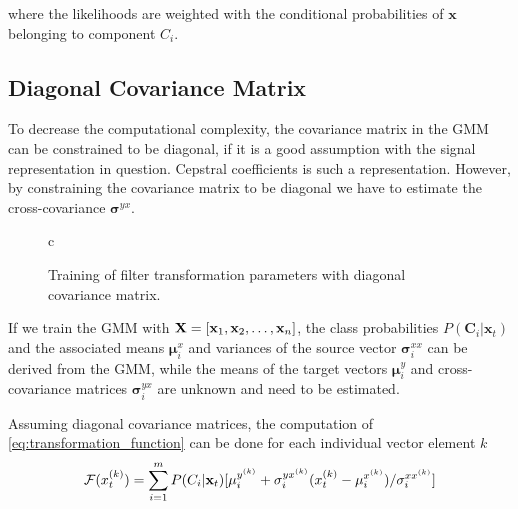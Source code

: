 where the likelihoods are weighted with the conditional probabilities of $\mathbf{x}$ belonging to component $C_i$. 

\subsection{Diagonal Covariance Matrix} %
\label{sub:diagonal_covariance_matrix}
To decrease the computational complexity, the covariance matrix in the GMM can be constrained to be diagonal, if it is a good assumption with the signal representation in question. Cepstral coefficients is such a representation. However, by constraining the covariance matrix to be diagonal we have to estimate the cross-covariance $\mathbf{\sigma}^{yx}$.

\begin{figure}[htbp]
	\centering
	\begin{tabular}[h]{c}
	\end{tabular}
	\caption{Training of filter transformation parameters with diagonal covariance matrix.}
	\label{fig:VC_training_diag}
\end{figure}

If we train the GMM with $\mathbf{X}=\left[\mathbf{x}_1,\mathbf{x}_2,\dotsc,\mathbf{x}_n\right]$, the class probabilities $P(\mathbf{C}_i\vert \mathbf{x}_t)$ and the associated means $\boldsymbol{\mu}_i^x$ and variances of the source vector $\boldsymbol{\sigma}_i^{xx}$ can be derived from the GMM, while the means of the target vectors $\boldsymbol{\mu}_i^y$ and cross-covariance matrices $\boldsymbol{\sigma}_i^{yx}$ are unknown and need to be estimated. 

Assuming diagonal covariance matrices, the computation of \eqref{eq:transformation_function} can be done for each individual vector element $k$
\begin{equation}
	\label{eq:diagonal_transformation}
	\mathcal F(x_t^{(k)}) = \sum_{i=1}^{m} P(C_i\vert \mathbf{x}_t) [\mu_i^{y^{(k)}}+\sigma_i^{yx^{(k)}}  (x_t^{(k)}-\mu_i^{x^{(k)}})/\sigma_i^{xx^{(k)}}]
\end{equation}

